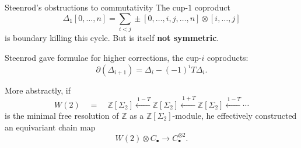 \documentclass[10pt,t]{beamer}
\begin{document}
\begin{frame}{Steenrod's obstructions to commutativity}
	The cup-$1$ coproduct
	\begin{equation*}
	\Delta_1 [0, \dots, n] = \sum_{i<j} \pm [0, \dots, i, j, \dots, n] \otimes [i, \dots, j]
	\end{equation*}
	is boundary killing this cycle. But is itself \textbf{not symmetric}.
	
	\vspace*{10pt} \pause
	
	Steenrod gave formulae for higher corrections, the cup-$i$ coproducts:
	\begin{equation*}
	\partial (\Delta_{i+1}) = \Delta_i - (-1)^i T \Delta_i.
	\end{equation*}
	
	\vspace*{0pt}\pause
	
	More abstractly, if
	\begin{equation*}
	W(2) \quad = \quad \mathbb Z[\Sigma_2] \stackrel{\ 1-T}{\longleftarrow} \mathbb Z[\Sigma_2] \stackrel{\ 1+T}{\longleftarrow} \mathbb Z[\Sigma_2] \stackrel{\ 1-T}{\longleftarrow} \cdots
	\end{equation*}
	is the minimal free resolution of $\mathbb Z$ as a $\mathbb Z[\Sigma_2]$-module, \pause he effectively constructed an equivariant chain map
	\begin{equation*}
	W(2) \otimes C_\bullet \to C_\bullet^{\otimes 2}.
	\end{equation*}
\end{frame}
	
\end{document}
